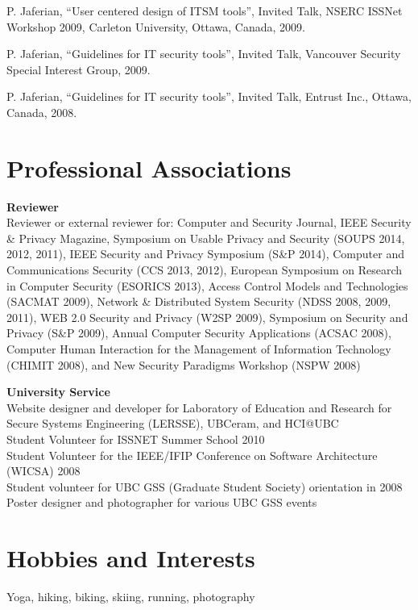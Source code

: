 \documentclass[margin]{res}
\begin{document}
\begin{resume}
P. Jaferian, ``User centered design of ITSM tools'',  Invited Talk, NSERC ISSNet Workshop 2009, Carleton University, Ottawa, Canada, 2009.


P. Jaferian, ``Guidelines for IT security tools'',  Invited Talk, Vancouver Security Special Interest Group, 2009.


P. Jaferian, ``Guidelines for IT security tools'',  Invited Talk, Entrust Inc., Ottawa, Canada, 2008.


\section{\sc Professional Associations}
{\bf Reviewer}\\
Reviewer or external reviewer for: Computer and Security Journal, IEEE Security \& Privacy Magazine, Symposium on Usable Privacy and Security (SOUPS 2014, 2012, 2011), IEEE Security and Privacy Symposium (S\&P 2014), Computer and Communications Security (CCS 2013, 2012), European Symposium on Research in Computer Security (ESORICS 2013), Access Control Models and Technologies (SACMAT 2009), Network \& Distributed System Security (NDSS 2008, 2009, 2011), WEB 2.0 Security and Privacy (W2SP 2009), Symposium on Security and Privacy (S\&P 2009), Annual Computer Security Applications (ACSAC 2008), Computer Human Interaction for the Management of Information Technology (CHIMIT 2008), and New Security Paradigms Workshop (NSPW 2008)

{\bf University Service}\\
Website designer and developer for Laboratory of Education and Research for Secure Systems Engineering (LERSSE), UBCeram, and HCI@UBC \\
Student Volunteer for ISSNET Summer School 2010\\
Student Volunteer for the IEEE/IFIP Conference on Software Architecture (WICSA) 2008\\
Student volunteer for UBC GSS (Graduate Student Society) orientation in 2008\\
Poster designer and photographer for various UBC GSS events\\

\section{\sc Hobbies and Interests}
Yoga, hiking, biking, skiing, running, photography

\end{resume}
\end{document}
